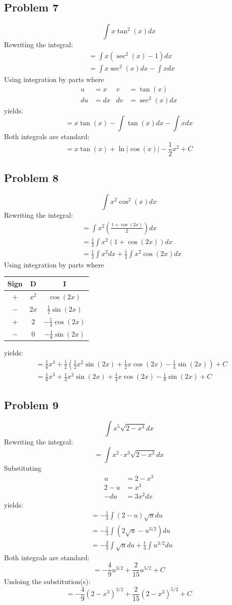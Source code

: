 \documentclass{article}
\begin{document}
\subsection*{Problem 7}
$$\int x\tan^2\left(x\right)dx$$
Rewriting the integral:
\begin{align*}
&=\int x(\sec^2(x)-1)dx \\
&=\int x\sec^2(x)dx- \int xdx
\end{align*}
Using integration by parts where
\begin{align*}
u&=x &v&=\tan(x) \\
du&=dx &dv&=\sec^2(x)dx
\end{align*}
yields:
$$=x\tan(x)-\int\tan(x)dx-\int xdx$$
Both integrals are standard:
$$=x\tan(x)+\ln|\cos(x)|-\frac{1}{2}x^2+C$$
\subsection*{Problem 8}
$$\int x^2\cos^2\left(x\right)dx$$
Rewriting the integral:
\begin{align*}
&=\int x^2\left(\frac{1+\cos(2x)}{2}\right)dx \\
&=\frac{1}{2}\int x^2(1+\cos(2x))dx \\
&=\frac{1}{2}\int x^2dx+\frac{1}{2}\int x^2\cos(2x)dx
\end{align*}
Using integration by parts where
\begin{center}
\begin{tabular}{ |c|c|c| } 
 \hline
 Sign & D & I \\
 \hline
 $+$ & $x^2$ & $\cos(2x)$ \\ 
 $-$ & $2x$ & $\frac{1}{2}\sin(2x)$ \\
 $+$ & $2$ & $-\frac{1}{4}\cos(2x)$ \\
 $-$ & $0$ & $-\frac{1}{8}\sin(2x)$ \\
 \hline
\end{tabular}
\end{center}
yields:
\begin{align*}
&=\frac{1}{6}x^3+\frac{1}{2}\left(\frac{1}{2}x^2\sin(2x)+\frac{1}{2}x\cos(2x)-\frac{1}{4}\sin(2x)\right)+C \\
&=\frac{1}{6}x^3+\frac{1}{4}x^2\sin(2x)+\frac{1}{4}x\cos(2x)-\frac{1}{8}\sin(2x)+C
\end{align*}
\subsection*{Problem 9}
$$\int x^5\sqrt{2-x^3}dx$$
Rewriting the integral:
$$=\int x^2\cdot x^3\sqrt{2-x^3}dx$$
Substituting
\begin{align*}
u&=2-x^3 \\
2-u&=x^3 \\
-du&=3x^2dx
\end{align*}
yields:
\begin{align*}
&=-\frac{1}{3}\int(2-u)\sqrt{u}du \\
&=-\frac{1}{3}\int\left(2\sqrt{u}-u^{3/2}\right)du \\
&=-\frac{2}{3}\int\sqrt{u}du+\frac{1}{3}\int u^{3/2}du
\end{align*}
Both integrals are standard:
$$=-\frac{4}{9}u^{3/2}+\frac{2}{15}u^{5/2}+C$$
Undoing the substitution(s):
$$=-\frac{4}{9}(2-x^3)^{3/2}+\frac{2}{15}(2-x^3)^{5/2}+C$$
\end{document}
